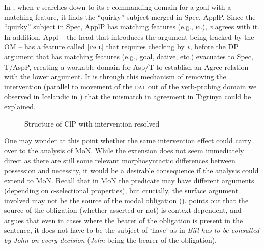 \documentclass[output=paper]{langscibook}
\begin{document}
In , when \emph{v} searches down to its c-commanding domain for a goal with a matching feature, it finds the ``quirky'' subject merged in Spec, ApplP. Since the ``quirky'' subject in Spec, ApplP has matching features (e.g., {\scshape pl}), \emph{v} agrees with it. In addition, Appl -- the head that introduces the argument being tracked by the OM -- has a feature called {[{\scshape incl}]} that requires checking by \emph{v}, before the DP argument that has matching features (e.g., goal, dative, etc.) evacuates to Spec, T/AspP, creating a workable domain for Asp/T to establish an Agree relation with the lower argument. It is through this mechanism of removing the intervention (parallel to movement of the {\scshape dat} out of the verb-probing domain we observed in Icelandic in ) that the mismatch in agreement in Tigrinya could be explained. 

\begin{figure} 
\caption{Structure of ClP with intervention resolved\label{fig:Gebregziabher:interventionTree1}}
\end{figure} 

One may wonder at this point whether the same intervention effect could carry over to the analysis of MoN. While the extension does not seem immediately direct as there are still some relevant morphosyntactic differences between possession and necessity, it would be a desirable consequence if the analysis could extend to MoN. Recall that in MoN the predicate may have different arguments (depending on c-selectional properties), but crucially, the surface argument involved may not be the source of the modal obligation (\citealt{bhatt97}). \citet{bhatt97} points out that the source of the obligation (whether asserted or not) is context-dependent, and argues that even in cases where the bearer of the obligation is present in the sentence, it does not have to be the subject of `have' as in \emph{Bill has to be consulted by John on every decision} (\emph{John} being the bearer of the obligation). 
\end{document}
